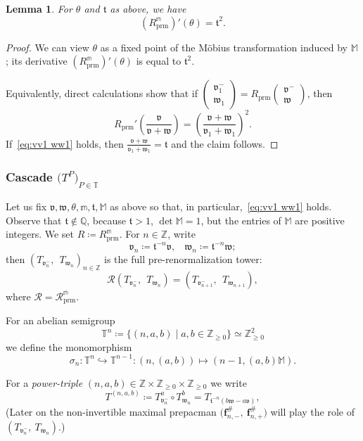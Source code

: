 \documentclass{amsart}
\renewcommand{\sp}{{\ \ }}
\newcommand{\1}{{\mathbb 1 }}
\newcommand\PT{\mathbb{ T}}
\newcommand\M{\mathbb M}
\newcommand\RR{\mathcal{R}}
\newcommand\cRR{R}%
\newcommand\prm{{\operatorname{prm}}}
\newcommand\RRc{\mathcal{R}_{\prm}}
\newcommand\cRRc{R_{\prm}}%
\newcommand{\bbf}{{\mathbf f}}
\newcommand{\mm}{\mathbb{m}}
\newcommand{\vv}{\mathfrak{v}}
\newcommand{\ww}{\mathfrak{w}}
\renewcommand{\tt}{\mathfrak{t}}
\newcommand{\Q}{\mathbb{Q}}
\newcommand{\Z}{\mathbb{Z}}
\newtheorem{lem}[thm]{Lemma}
\theoremstyle{remark}
\numberwithin{equation}{section}
\theoremstyle{definition}
\theoremstyle{nonumberbreak}
\begin{document}
\begin{lem} 
\label{lem:lambda:t*t}
For $\theta$ and $\tt$ as above, we have
 \[\left(\cRRc^\mm\right)'(\theta)=\tt^2.\]
\end{lem}        
 \begin{proof}
We can view $\theta$ as a fixed point of the M\"obius transformation induced by $\M$; its derivative $\left(\cRRc^\mm\right)'(\theta)$ is equal to $\tt^2$. 

Equivalently, direct calculations show that if $ \left(\begin{matrix}
        \vv^-_1 \\
  \ww_1
        \end{matrix} \right) = \cRRc \left(\begin{matrix}
        \vv^- \\
  \ww
        \end{matrix} \right)$, then
\[ \cRRc'\left(\frac{\vv}{\vv+\ww}\right)=\left(\frac{\vv+\ww}{\vv_1+\ww_1}\right)^2.\] If~\eqref{eq:vv1 ww1} holds, then $\frac{\vv+\ww}{\vv_1+\ww_1}=\tt$ and the claim follows.
 \end{proof}
 
\subsubsection{Cascade $\big(T^P\big)_{P\in \PT}$}
\label{sss:power-triples}
 Let us fix $\vv,\ww,\theta,\mm, \tt, \M$ as above so that, in particular,~\eqref{eq:vv1 ww1} holds. Observe that $\tt\not\in \Q$, because $\tt>1$, $\det \M=1$, but the entries of $\M$ are positive integers. We set $\cRR\coloneqq \cRRc^\mm$. For $n\in \Z$, write \[\vv_n\coloneqq \tt^{-n}\vv,\sp\sp \ww_n \coloneqq \tt^{-n} \ww;\]
then $(T_{\vv^-_n},\sp T_{\ww_n} )_{n\in \Z}$ is the full pre-renormalization tower: \begin{equation}
\label{eq:defn RR on transl}
\RR \left(T_{\vv^-_n},\sp T_{\ww_n} \right)=\left(T_{\vv^-_{n+1}},\sp T_{\ww_{n+1}} \right),
\end{equation}
where $\RR=\RRc^\mm$.

For an abelian semigroup
 \[\PT^{n}\coloneqq \{(n,a,b)\mid a,b \in\Z_{\ge 0}\}\simeq\Z_{\ge0}^2\]
we define the monomorphism
\[\sigma_n\colon \PT^{n}\hookrightarrow \PT^{n-1}\colon (n,(a,b))\mapsto (n-1,(a,b)\M).\]


 For a \emph{power-triple} $(n,a,b)\in \Z\times \Z_{\ge0 }\times \Z_{\ge0}$ we write 
\begin{equation} 
 \label{eq:T n a b}
 T^{(n,a,b)}\coloneqq T^a_{\vv^-_n}\circ T^b_{\ww_n}=T_{\tt^{-n}(b\ww-a\vv)},
\end{equation}
(Later on the non-invertible maximal prepacman $\big(\bbf_{n,-}^\#,~ \bbf_{n,+}^\#\big)$ will play the role of $(T_{\vv^-_n},~T_{\ww_n})$.)
\end{document}
